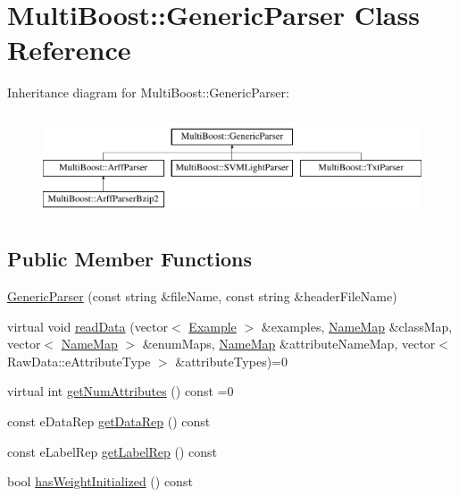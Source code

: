\hypertarget{classMultiBoost_1_1GenericParser}{\section{Multi\-Boost\-:\-:Generic\-Parser Class Reference}
\label{classMultiBoost_1_1GenericParser}
}
Inheritance diagram for Multi\-Boost\-:\-:Generic\-Parser\-:\begin{figure}[H]
\begin{center}
\leavevmode
\includegraphics[height=3.000000cm]{classMultiBoost_1_1GenericParser}
\end{center}
\end{figure}
\subsection*{Public Member Functions}
\begin{DoxyCompactItemize}
\item 
\hyperlink{classMultiBoost_1_1GenericParser_a1d241680986eb2d61ab9647a4f7c36a8}{Generic\-Parser} (const string \&file\-Name, const string \&header\-File\-Name)
\item 
virtual void \hyperlink{classMultiBoost_1_1GenericParser_ab9fb682a99c24f9a3ba08619b6e9686f}{read\-Data} (vector$<$ \hyperlink{classMultiBoost_1_1Example}{Example} $>$ \&examples, \hyperlink{classMultiBoost_1_1NameMap}{Name\-Map} \&class\-Map, vector$<$ \hyperlink{classMultiBoost_1_1NameMap}{Name\-Map} $>$ \&enum\-Maps, \hyperlink{classMultiBoost_1_1NameMap}{Name\-Map} \&attribute\-Name\-Map, vector$<$ Raw\-Data\-::e\-Attribute\-Type $>$ \&attribute\-Types)=0
\item 
virtual int \hyperlink{classMultiBoost_1_1GenericParser_a5daee3b49a8cb5c2bbb515d19bff3cd6}{get\-Num\-Attributes} () const =0
\item 
const e\-Data\-Rep \hyperlink{classMultiBoost_1_1GenericParser_a0997b24d68eca260eaf01c5b20a5bba0}{get\-Data\-Rep} () const 
\item 
const e\-Label\-Rep \hyperlink{classMultiBoost_1_1GenericParser_aa6ef9b1f07ac052107a4dbc90edc7289}{get\-Label\-Rep} () const 
\item 
bool \hyperlink{classMultiBoost_1_1GenericParser_a9887f8d7904a2ed984d8825bfaa3285c}{has\-Weight\-Initialized} () const 
\end{DoxyCompactItemize}
